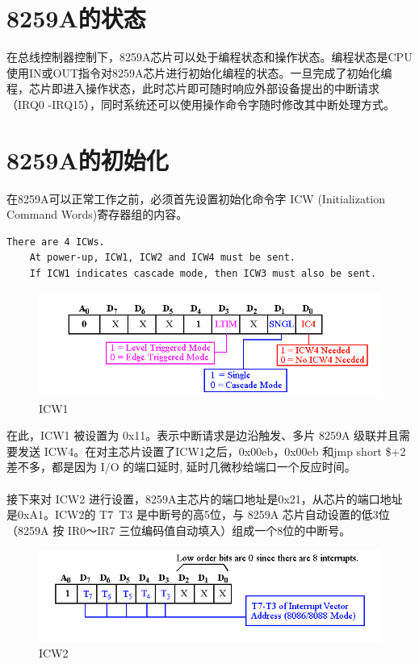 \documentclass[12pt]{article}
\begin{document}
\section{8259A的状态}
在总线控制器控制下，8259A芯片可以处于编程状态和操作状态。编程状态是CPU使用IN或OUT指令对8259A芯片进行初始化编程的状态。一旦完成了初始化编程，芯片即进入操作状态，此时芯片即可随时响应外部设备提出的中断请求（IRQ0 -IRQ15），同时系统还可以使用操作命令字随时修改其中断处理方式。
\section{8259A的初始化}
在8259A可以正常工作之前，必须首先设置初始化命令字 ICW (Initialization Command Words)寄存器组的内容。
\begin{lstlisting}[breaklines]
There are 4 ICWs.
    At power-up, ICW1, ICW2 and ICW4 must be sent.
    If ICW1 indicates cascade mode, then ICW3 must also be sent.
\end{lstlisting}
\begin{figure}[htbp]
\centering
\includegraphics[scale=0.4]{fig/2.png}
\caption{ICW1}
\label{fig:8259 ICW1}
\end{figure}
在此，ICW1 被设置为 0x11。表示中断请求是边沿触发、多片 8259A 级联并且需要发送 ICW4。在对主芯片设置了ICW1之后，0x00eb，0x00eb 和jmp short \$+2 差不多，都是因为 I/O 的端口延时, 延时几微秒给端口一个反应时间。\\\\
接下来对 ICW2 进行设置，8259A主芯片的端口地址是0x21，从芯片的端口地址是0xA1。ICW2的 T7~T3 是中断号的高5位，与 8259A 芯片自动设置的低3位（8259A 按 IR0～IR7 三位编码值自动填入）组成一个8位的中断号。
\begin{figure}[htbp]
\centering
\includegraphics[scale=0.5]{fig/3.png}
\caption{ICW2}
\label{fig:8259 ICW2}
\end{figure}
\end{document}
